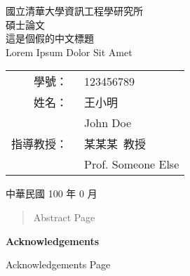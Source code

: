 \documentclass[12pt]{article}
\begin{document}
\begin{CJK}{UTF8}{bkai}

\begin{titlepage}
\begin{center}
\Large 國立清華大學資訊工程學研究所 \\
\Large 碩士論文 \\
\vspace*{10ex}
\huge 這是個假的中文標題 \\
\vspace*{1ex}
\huge Lorem Ipsum Dolor Sit Amet \\

\null
\vfill

\Large
\begin{tabular}{r@{} @{}l}
    學號：~&123456789          \\
    姓名：~&王小明             \\
           &John Doe           \\
指導教授：~&某某某~教授        \\
           &Prof. Someone Else \\
\end{tabular}

\vspace*{2ex}
\Large 中華民國 100 年 0 月
\end{center}
\end{titlepage}

\doublespacing
{}
\setcounter{page}{3}

\renewcommand{\abstractnamefont}{\normalfont\bfseries}
\renewcommand{\abstracttextfont}{\normalfont}
\setlength{\absleftindent}{0pt}
\setlength{\absrightindent}{0pt}

\begin{abstract}  %
	Abstract Page
\end{abstract}
\clearpage
{}

\begin{center}
\textbf{Acknowledgements}
\end{center}
Acknowledgements Page
\clearpage

\singlespacing

\tableofcontents  %
\clearpage
{}
\listoffigures  %
\clearpage
{}
\listoftables  %
\clearpage


\end{CJK}
\end{document}
